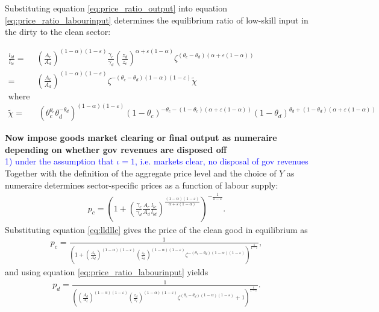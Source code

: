 Substituting equation \ref{eq:price_ratio_output} into equation \ref{eq:price_ratio_labourinput} determines the equilibrium ratio of low-skill input in the dirty to the clean sector: 

\begin{align}
\frac{l_{ld}}{l_{lc}}=&\left(\frac{A_c}{A_d}\right)^{(1-\alpha)(1-\varepsilon)}\frac{\gamma_c}{\gamma_d}\left(\frac{z_d}{z_c}\right)^{\alpha+\varepsilon(1-\alpha)}\zeta^{(\theta_c-\theta_d)(\alpha+\varepsilon(1-\alpha))}\nonumber\\
=& \left(\frac{A_c}{A_d}\right)^{(1-\alpha)(1-\varepsilon)}\zeta^{-(\theta_c-\theta_d)(1-\alpha)(1-\varepsilon)}\tilde{\chi}\label{eq:lldllc}\\
\text{where}&\\
 \tilde{\chi}= &\  (\theta_c^{\theta_c}\theta_d^{-\theta_d})^{(1-\alpha) (1-\varepsilon)}(1-\theta_c)^{-\theta_c-(1-\theta_c)(\alpha+\varepsilon(1-\alpha))}(1-\theta_d)^{\theta_d+(1-\theta_d)(\alpha+\varepsilon(1-\alpha))}\nonumber
	\end{align}


\noindent \textbf{Now impose goods market clearing or final output as numeraire depending on whether gov revenues are disposed off}\\
\textcolor{blue}{1) under the assumption that $\iota =1$, i.e. markets clear, no disposal of gov revenues}\\
Together with the definition of the aggregate price level and the choice of $Y$ as numeraire determines sector-specific prices as a function of labour supply:
\begin{align*}
p_c= \left(1+\left(\frac{\gamma_c}{\gamma_d}\frac{A_c}{A_d}\frac{l_{lc}}{l_{ld}}\right)^{\frac{(1-\alpha)(1-\varepsilon)}{\alpha+\varepsilon(1-\alpha)}}\right)^{-\frac{1}{1-\varepsilon}}.
\end{align*}
 Substituting equation \ref{eq:lldllc} gives the price of the clean good in equilibrium as
 \begin{align}\label{eq:eq_pc}
	p_c=\frac{1}{\left(1+\left(\frac{A_c}{A_d}\right)^{(1-\alpha)(1-\varepsilon)}\left(\frac{z_c}{z_d}\right)^{(1-\alpha)(1-\varepsilon)}\zeta^{-(\theta_c-\theta_d)(1-\alpha)(1-\varepsilon)}\right)^{\frac{1}{1-\varepsilon}}},
 \end{align}
and using equation \ref{eq:price_ratio_labourinput} yields
\begin{align}\label{eq:eq_pd}
p_d=\frac{1}{\left(\left(\frac{A_d}{A_c}\right)^{(1-\alpha)(1-\varepsilon)}\left(\frac{z_d}{z_c}\right)^{(1-\alpha)(1-\varepsilon)}\zeta^{(\theta_c-\theta_d)(1-\alpha)(1-\varepsilon)}+1\right)^{\frac{1}{1-\varepsilon}}}.
\end{align}

